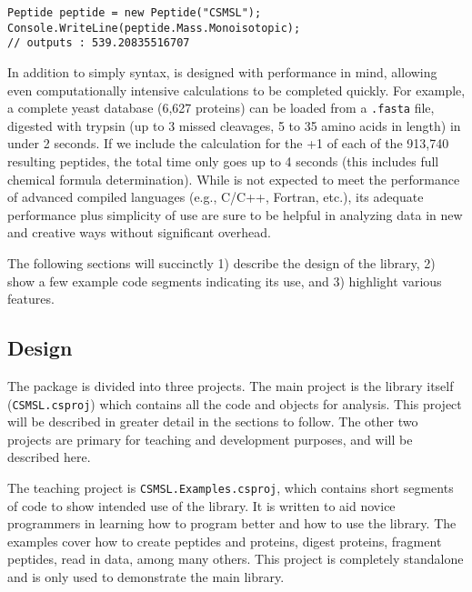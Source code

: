 \lstset{style=sharpc}
\begin{lstlisting}
Peptide peptide = new Peptide("CSMSL");
Console.WriteLine(peptide.Mass.Monoisotopic);
// outputs : 539.20835516707
\end{lstlisting}

In addition to simply syntax, \csmsl{} is designed with performance in mind, allowing even computationally intensive calculations to be completed quickly. For example, a complete yeast database (6,627 proteins) can be loaded from a \texttt{.fasta} file, digested with trypsin (up to 3 missed cleavages, 5 to 35 amino acids in length) in under 2 seconds. If we include the calculation for the +1 \mz{} of each of the 913,740 resulting peptides, the total time only goes up to 4 seconds (this includes full chemical formula determination). While \csmsl{} is not expected to meet the performance of advanced compiled languages (e.g., C/C++, Fortran, etc.), its adequate performance plus simplicity of use are sure to be helpful in analyzing data in new and creative ways without significant overhead.

The following sections will succinctly 1) describe the design of the library, 2) show a few example code segments indicating its use, and 3) highlight various features.

\subsection*{Design}
The \csmsl{} package is divided into three projects. The main project is the library itself (\texttt{CSMSL.csproj}) which contains all the code and objects for analysis. This project will be described in greater detail in the sections to follow. The other two projects are primary for teaching and development purposes, and will be described here. 

The teaching project is \texttt{CSMSL.Examples.csproj}, which contains short segments of code to show intended use of the library. It is written to aid novice programmers in learning how to program better and how to use the library. The examples cover how to create peptides and proteins, digest proteins, fragment peptides, read in data, among many others. This project is completely standalone and is only used to demonstrate the main library. 

